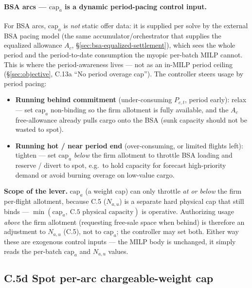 \documentclass[11pt,a4paper]{article}
\theoremstyle{definition}
\begin{document}
\paragraph{BSA arcs --- $\text{cap}_a$ is a dynamic period-pacing control input.}
For BSA arcs, $\text{cap}_a$ is \emph{not} static offer data: it is supplied
per solve by the external BSA pacing model (the same accumulator/orchestrator
that supplies the equalized allowance $A_c$, \S\ref{sec:bsa-equalized-settlement}),
which sees the whole period and the period-to-date consumption the myopic
per-batch MILP cannot. This is where the period-awareness lives --- not as an
in-MILP period ceiling (\S\ref{sec:objective}, C.13a ``No period overage
cap''). The controller steers usage by period pacing:
\begin{itemize}[noitemsep]
  \item \textbf{Running behind commitment} (under-consuming $P_{c,t}$, period
        early): relax --- set $\text{cap}_a$ non-binding so the firm allotment
        is fully available, and the $A_c$ free-allowance already pulls cargo
        onto the BSA (sunk capacity should not be wasted to spot).
  \item \textbf{Running hot / near period end} (over-consuming, or limited
        flights left): tighten --- set $\text{cap}_a$ \emph{below} the firm
        allotment to throttle BSA loading and reserve / divert to spot,
        e.g.\ to hold capacity for forecast high-priority demand or avoid
        burning overage on low-value cargo.
\end{itemize}
\textbf{Scope of the lever.} $\text{cap}_a$ (a weight cap) can only throttle
\emph{at or below} the firm per-flight allotment, because C.5 ($N_{a,u}$) is a
separate hard physical cap that still binds --- $\min(\text{cap}_a,\ \text{C.5
physical capacity})$ is operative. Authorizing usage \emph{above} the firm
allotment (requesting free-sale space when behind) is therefore an adjustment
to $N_{a,u}$ (C.5), not to $\text{cap}_a$; the controller may set both. Either
way these are exogenous control inputs --- the MILP body is unchanged, it
simply reads the per-batch $\text{cap}_a$ and $N_{a,u}$ values.

\subsection*{C.5d Spot per-arc chargeable-weight cap }
\end{document}
